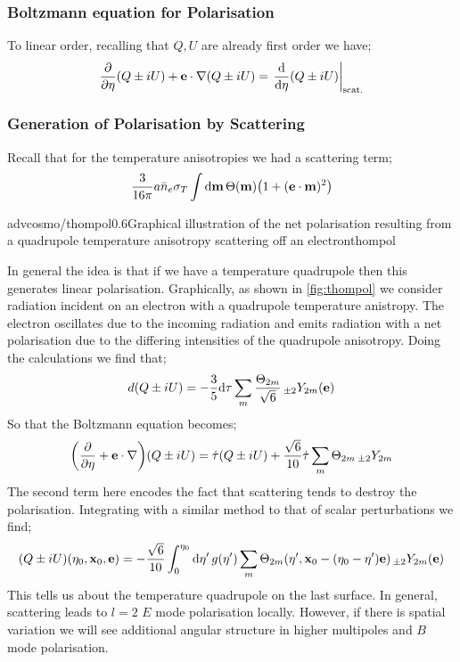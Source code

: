 \subsubsection{Boltzmann equation for Polarisation}
To linear order, recalling that $Q, U$ are already first order we have;
\begin{equation*}
\frac{\del}{\del \eta}\left(Q \pm iU\right) + \vec{e}\cdot \nabla \left(Q \pm i U\right) = \left.\frac{\ud}{\ud \eta}\left(Q \pm i U\right)\right|_{\text{scat.}}
\end{equation*}
\subsubsection*{Generation of Polarisation by Scattering}
Recall that for the temperature anisotropies we had a scattering term;
\begin{equation*}
\frac{3}{16\pi}a\bar{n}_e \sigma_T \int{\upd{\vec{m}}\Theta(\vec{m})\left(1 + (\vec{e}\cdot\vec{m})^2\right)}
\end{equation*}
\begin{mygraphic}{advcosmo/thompol}{0.6}{Graphical illustration of the net polarisation resulting from a quadrupole temperature anisotropy scattering off an electron}{thompol}\end{mygraphic}
In general the idea is that if we have a temperature quadrupole then this generates linear polarisation. Graphically, as shown in \autoref{fig:thompol} we consider radiation incident on an electron with a quadrupole temperature anistropy. The electron oscillates due to the incoming radiation and emits radiation with a net polarisation due to the differing intensities of the quadrupole anisotropy. Doing the calculations we find that;
\begin{equation*}
d\left(Q \pm i U\right) = -\frac{3}{5}\ud \tau \sum_{m}{\frac{\Theta_{2m}}{\sqrt{6}}\, _{\pm2}Y_{2m}(\vec{e})}
\end{equation*}
So that the Boltzmann equation becomes;
\begin{equation*}
\left(\frac{\del}{\del \eta} + \vec{e}\cdot \nabla\right)\left(Q \pm i U\right) = \dot{\tau}\left(Q \pm i U\right) + \frac{\sqrt{6}}{10}\dot{\tau} \sum_{m}{\Theta_{2m}\, _{\pm2}Y_{2m}}
\end{equation*}
The second term here encodes the fact that scattering tends to destroy the polarisation. Integrating with a similar method to that of scalar perturbations we find;
\begin{dmath*}
(Q \pm iU)(\eta_0, \vec{x}_0, \vec{e}) = -\frac{\sqrt{6}}{10}\int_0^{\eta_0}{\upd{\eta\pr}g(\eta\pr)\sum_{m}{\Theta_{2m}\left(\eta\pr, \vec{x}_0 - (\eta_0 - \eta\pr)\vec{e}\right)\, _{\pm 2}Y_{2m}(\vec{e})}}
\end{dmath*}
This tells us about the temperature quadrupole on the last surface. In general, scattering leads to $l = 2$ $E$ mode polarisation locally. However, if there is spatial variation we will see additional angular structure in higher multipoles and $B$ mode polarisation.
